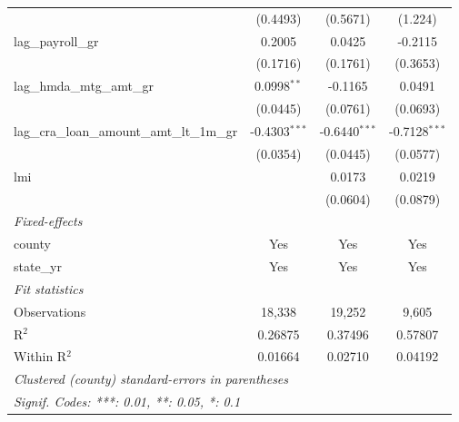\begin{tabular}{lccc}
                                                  & (0.4493)        & (0.5671)        & (1.224)\\   
   lag\_payroll\_gr                               & 0.2005          & 0.0425          & -0.2115\\   
                                                  & (0.1716)        & (0.1761)        & (0.3653)\\   
   lag\_hmda\_mtg\_amt\_gr                        & 0.0998$^{**}$   & -0.1165         & 0.0491\\   
                                                  & (0.0445)        & (0.0761)        & (0.0693)\\   
   lag\_cra\_loan\_amount\_amt\_lt\_1m\_gr        & -0.4303$^{***}$ & -0.6440$^{***}$ & -0.7128$^{***}$\\   
                                                  & (0.0354)        & (0.0445)        & (0.0577)\\   
   lmi                                            &                 & 0.0173          & 0.0219\\   
                                                  &                 & (0.0604)        & (0.0879)\\   
   \midrule
   \emph{Fixed-effects}\\
   county                                         & Yes             & Yes             & Yes\\  
   state\_yr                                      & Yes             & Yes             & Yes\\  
   \midrule
   \emph{Fit statistics}\\
   Observations                                   & 18,338          & 19,252          & 9,605\\  
   R$^2$                                          & 0.26875         & 0.37496         & 0.57807\\  
   Within R$^2$                                   & 0.01664         & 0.02710         & 0.04192\\  
   \midrule \midrule
   \multicolumn{4}{l}{\emph{Clustered (county) standard-errors in parentheses}}\\
   \multicolumn{4}{l}{\emph{Signif. Codes: ***: 0.01, **: 0.05, *: 0.1}}\\
\end{tabular}
\par\endgroup

